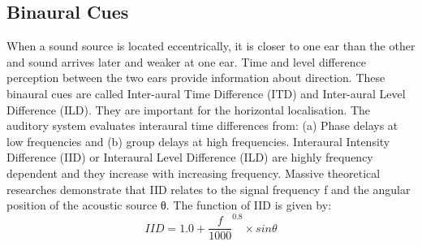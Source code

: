 \documentclass[BTech]{nitkdiss}
\begin{document}
\subsection{Binaural Cues}
When a sound source is located eccentrically, it is closer to one ear than the other and sound arrives later and weaker at one ear. Time and level difference perception between the two ears provide information about direction. These binaural cues are called Inter-aural Time Difference (ITD) and Inter-aural Level Difference (ILD). They are important for the horizontal localisation. The auditory system evaluates interaural time differences from: (a) Phase delays at low frequencies and (b) group delays at high frequencies. Interaural Intensity Difference (IID) or Interaural Level Difference (ILD) are highly frequency dependent and they increase with increasing frequency. Massive theoretical researches demonstrate that IID relates to the signal frequency f and the angular position of the acoustic source θ. The function of IID is given by:
 \begin{equation}
IID = 1.0 + \frac{f}{1000}^{0.8} \times sin\theta
\end{equation}
\end{document}
